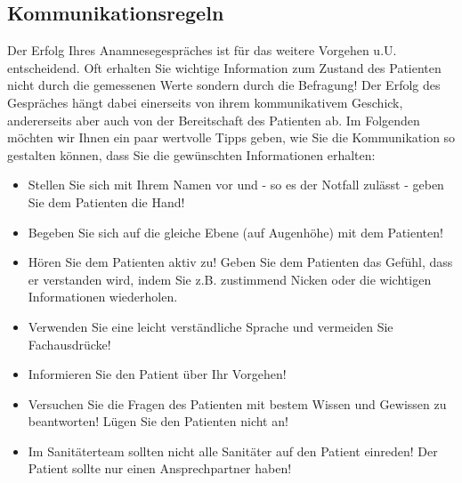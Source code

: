 \subsection{Kommunikationsregeln}
\label{topic:kommunikationsregeln}


Der Erfolg Ihres Anamnesegespräches ist für das weitere Vorgehen u.U. entscheidend. Oft erhalten Sie wichtige Information zum Zustand des Patienten nicht durch die gemessenen Werte sondern durch die Befragung! Der Erfolg des Gespräches hängt dabei einerseits von ihrem kommunikativem Geschick, andererseits aber auch von der Bereitschaft des Patienten ab. Im Folgenden möchten wir Ihnen ein paar wertvolle Tipps geben, wie Sie die Kommunikation so gestalten können, dass Sie die gewünschten Informationen erhalten:
\begin{itemize}
    \item Stellen Sie sich mit Ihrem Namen vor und - so es der Notfall zulässt - geben Sie dem Patienten die Hand!
    \item Begeben Sie sich auf die gleiche Ebene (auf Augenhöhe) mit dem Patienten!
    \item Hören Sie dem Patienten aktiv zu! Geben Sie dem Patienten das Gefühl, dass er verstanden wird, indem Sie z.B. zustimmend Nicken oder die wichtigen Informationen wiederholen.
    \item Verwenden Sie eine leicht verständliche Sprache und vermeiden Sie Fachausdrücke!
    \item Informieren Sie den Patient über Ihr Vorgehen!
    \item Versuchen Sie die Fragen des Patienten mit bestem Wissen und Gewissen zu beantworten! Lügen Sie den Patienten nicht an!
    \item Im Sanitäterteam sollten nicht alle Sanitäter auf den Patient einreden! Der Patient sollte nur einen Ansprechpartner haben!
\end{itemize}

